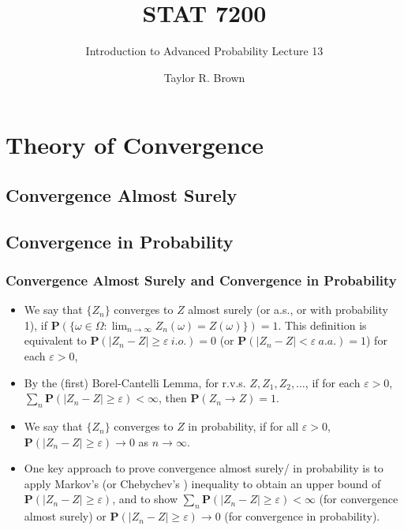 \documentclass[handout]{beamer}
\title{STAT 7200}
\subtitle{Introduction to Advanced Probability \newline Lecture 13}
\author{Taylor R. Brown}
\institute{}
\date{}
\newcommand{\BP}{\mathbf{P}}
\begin{document}
\frame{\titlepage}

\section[Outline]{}
\frame{\tableofcontents}

\section{Theory of Convergence}
\subsection{Convergence Almost Surely}
\subsection{Convergence in Probability}

\frame
{
  \frametitle{Convergence Almost Surely and Convergence in Probability}

   \begin{itemize}
       \item<1-> We say that $\{Z_n\}$ converges to $Z$ almost surely (or a.s., or with probability 1), if $\BP(\{\omega \in \Omega : \lim_{n\rightarrow \infty} Z_n(\omega)= Z(\omega)\})=1$. This definition is equivalent to $\BP(|Z_n-Z| \geq \varepsilon \  i.o.)=0$ (or $\BP(|Z_n-Z| < \varepsilon \  a.a.)=1$)  for each $\varepsilon>0$,     
       
       \item<1-> By the (first) Borel-Cantelli Lemma, for r.v.s. $Z, Z_1, Z_2, \ldots $, if for each $\varepsilon>0$, $\sum_n \BP(|Z_n-Z| \geq \varepsilon)<\infty$, then $\BP(Z_n\rightarrow Z)=1$.  \newline 
       
         \item<2-> We say that $\{Z_n\}$ converges to $Z$ in probability, if for all $\varepsilon>0$, $\BP(|Z_n-Z|\geq \varepsilon) \rightarrow 0$ as $n\rightarrow \infty$. \newline
         
        \item<3->  One key approach to prove convergence almost surely/ in probability is to apply Markov's  (or Chebychev's ) inequality to obtain an upper bound of $\BP(|Z_n-Z|\geq \varepsilon)$, and to show  $\sum_n \BP(|Z_n-Z| \geq \varepsilon)<\infty$ (for convergence almost surely) or  $\BP(|Z_n-Z|\geq \varepsilon) \rightarrow 0$ (for convergence in probability). 

                
\end{itemize}
}
\end{document}
